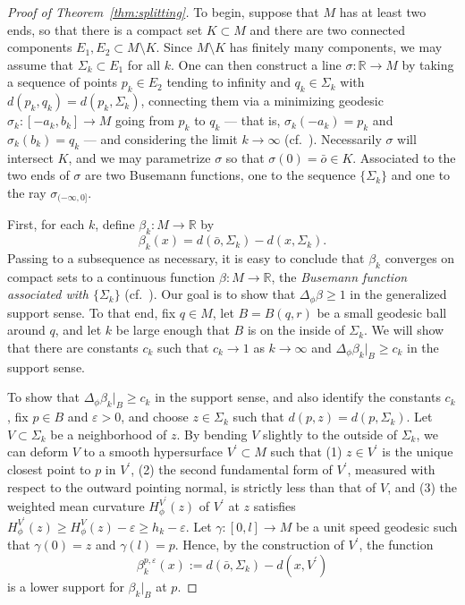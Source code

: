 \documentclass{amsart}
\theoremstyle{definition}
\theoremstyle{remark}
\numberwithin{equation}{section}
\begin{document}
\begin{proof}[Proof of Theorem~\ref{thm:splitting}]

To begin, suppose that $M$ has at least two ends, so that there is a compact set $K\subset M$ and there are two connected components $E_1,E_2\subset M\setminus K$.  Since $M\setminus K$ has finitely many components, we may assume that $\Sigma_k\subset E_1$ for all $k$.  One can then construct a line $\sigma\colon{\mathbb{R}}\to M$ by taking a sequence of points $p_k\in E_2$ tending to infinity and $q_k\in \Sigma_k$ with $d(p_k,q_k)=d(p_k,\Sigma_k)$, connecting them via a minimizing geodesic $\sigma_k\colon[-a_k,b_k]\to M$ going from $p_k$ to $q_k$ --- that is, $\sigma_k(-a_k)=p_k$ and $\sigma_k(b_k)=q_k$ --- and considering the limit $k\to\infty$ (cf.\ \cite{CaiGalloway1999}).  Necessarily $\sigma$ will intersect $K$, and we may parametrize $\sigma$ so that $\sigma(0)=\bar o\in K$.  Associated to the two ends of $\sigma$ are two Busemann functions, one to the sequence $\{\Sigma_k\}$ and one to the ray $\sigma_{(-\infty,0]}$.

First, for each $k$, define $\beta_k\colon M\to{\mathbb{R}}$ by
\[ \beta_k(x) = d(\bar o,\Sigma_k) - d(x,\Sigma_k) . \]
Passing to a subsequence as necessary, it is easy to conclude that $\beta_k$ converges on compact sets to a continuous function $\beta\colon M\to{\mathbb{R}}$, the \emph{Busemann function associated with $\{\Sigma_k\}$} (cf.\ \cite{CaiGalloway1999}).  Our goal is to show that $\Delta_\phi\beta\geq 1$ in the generalized support sense.  To that end, fix $q\in M$, let $B=B(q,r)$ be a small geodesic ball around $q$, and let $k$ be large enough that $B$ is on the inside of $\Sigma_k$.  We will show that there are constants $c_k$ such that $c_k\to1$ as $k\to\infty$ and $\Delta_\phi\beta_k{\rvert}_B\geq c_k$ in the support sense.

To show that $\Delta_\phi\beta_k{\rvert}_B\geq c_k$ in the support sense, and also identify the constants $c_k$, fix $p\in B$ and $\varepsilon>0$, and choose $z\in\Sigma_k$ such that $d(p,z)=d(p,\Sigma_k)$.  Let $V\subset\Sigma_k$ be a neighborhood of $z$.  By bending $V$ slightly to the outside of $\Sigma_k$, we can deform $V$ to a smooth hypersurface $V^\prime\subset M$ such that (1) $z\in V^\prime$ is the unique closest point to $p$ in $V^\prime$, (2) the second fundamental form of $V^\prime$, measured with respect to the outward pointing normal, is strictly less than that of $V$, and (3) the weighted mean curvature $H_\phi^{V^\prime}(z)$ of $V^\prime$ at $z$ satisfies $H_\phi^{V^\prime}(z)\geq H_\phi^V(z)-\varepsilon\geq h_k-\varepsilon$.  Let $\gamma\colon[0,l]\to M$ be a unit speed geodesic such that $\gamma(0)=z$ and $\gamma(l)=p$.  Hence, by the construction of $V^\prime$, the function
\[ \beta_k^{p,\varepsilon}(x) := d(\bar o,\Sigma_k) - d(x,V^\prime) \]
is a lower support for $\beta_k{\rvert}_B$ at $p$.


\end{proof}
\end{document}
